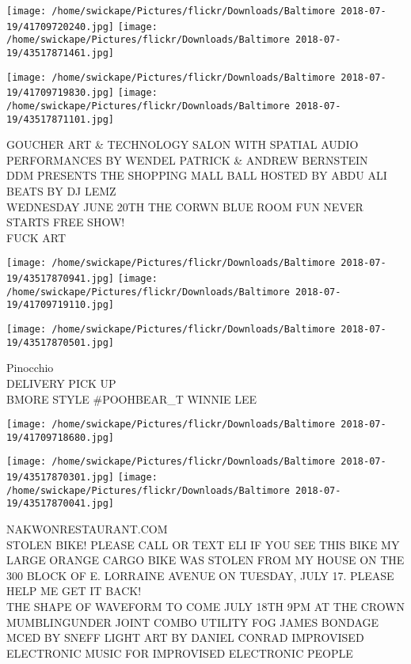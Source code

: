 \documentclass[10pt,letterpaper]{article}
\begin{document}
\texttt{[image: /home/swickape/Pictures/flickr/Downloads/Baltimore 2018-07-19/41709720240.jpg]}
\texttt{[image: /home/swickape/Pictures/flickr/Downloads/Baltimore 2018-07-19/43517871461.jpg]}

\texttt{[image: /home/swickape/Pictures/flickr/Downloads/Baltimore 2018-07-19/41709719830.jpg]}
\texttt{[image: /home/swickape/Pictures/flickr/Downloads/Baltimore 2018-07-19/43517871101.jpg]}

GOUCHER ART \& TECHNOLOGY SALON WITH SPATIAL AUDIO PERFORMANCES BY WENDEL PATRICK \& ANDREW BERNSTEIN\\
DDM PRESENTS THE SHOPPING MALL BALL HOSTED BY ABDU ALI BEATS BY DJ LEMZ\\
WEDNESDAY JUNE 20TH THE CORWN BLUE ROOM FUN NEVER STARTS FREE SHOW!\\
FUCK ART\\
\pagebreak

\texttt{[image: /home/swickape/Pictures/flickr/Downloads/Baltimore 2018-07-19/43517870941.jpg]}
\texttt{[image: /home/swickape/Pictures/flickr/Downloads/Baltimore 2018-07-19/41709719110.jpg]}

\texttt{[image: /home/swickape/Pictures/flickr/Downloads/Baltimore 2018-07-19/43517870501.jpg]}

Pinocchio\\
DELIVERY PICK UP\\
BMORE STYLE \#POOHBEAR\_T WINNIE LEE\\
\pagebreak

\texttt{[image: /home/swickape/Pictures/flickr/Downloads/Baltimore 2018-07-19/41709718680.jpg]}

\vspace{0.25in}
\texttt{[image: /home/swickape/Pictures/flickr/Downloads/Baltimore 2018-07-19/43517870301.jpg]}
\texttt{[image: /home/swickape/Pictures/flickr/Downloads/Baltimore 2018-07-19/43517870041.jpg]}

NAKWONRESTAURANT.COM\\
STOLEN BIKE!  PLEASE CALL OR TEXT ELI IF YOU SEE THIS BIKE MY LARGE ORANGE CARGO BIKE WAS STOLEN FROM MY HOUSE ON THE 300 BLOCK OF E. LORRAINE AVENUE ON TUESDAY, JULY 17.  PLEASE HELP ME GET IT BACK!\\
THE SHAPE OF WAVEFORM TO COME JULY 18TH 9PM AT THE CROWN MUMBLINGUNDER JOINT COMBO UTILITY FOG JAMES BONDAGE MCED BY SNEFF LIGHT ART BY DANIEL CONRAD IMPROVISED ELECTRONIC MUSIC FOR IMPROVISED ELECTRONIC PEOPLE\\
\pagebreak
\end{document}
